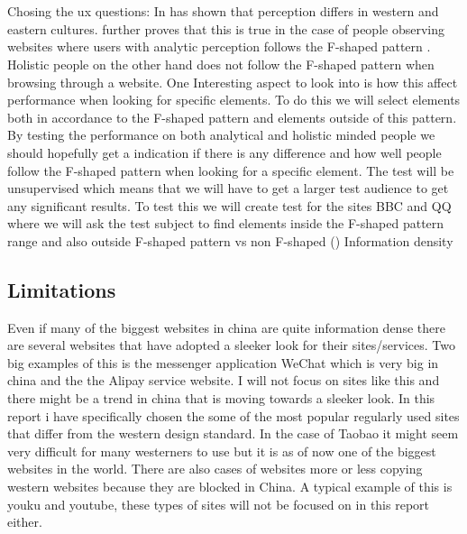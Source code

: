   \\\\
  Chosing the ux questions:
  In \cite{Holistic_vs_Analytic} has shown that perception differs in western and eastern cultures. \cite{cross_web} further proves that this is true in the case of people observing websites where users with analytic perception follows the F-shaped pattern \cite{pernice2014people}. Holistic people on the other hand does not follow the F-shaped pattern when browsing through a website. \cite{cross_web} One Interesting aspect to look into is how this affect performance when looking for specific elements. To do this we will select elements both in accordance to the F-shaped pattern and elements outside of this pattern. By testing the performance on both analytical and holistic minded people we should hopefully get a indication if there is any difference and how well people follow the F-shaped pattern when looking for a specific element. The test will be unsupervised which means that we will have to get a larger test audience to get any significant results. To test this we will create test for the sites BBC and QQ where we will ask the test subject to find elements inside the F-shaped pattern range and also outside
  F-shaped pattern vs non F-shaped (\cite{cross_web})
  Information density
   
 \subsection{Limitations}
 Even if many of the biggest websites in china are quite information dense there are several websites that have adopted a sleeker look for their sites/services. Two big examples of this is the messenger application WeChat which is very big in china and the the Alipay service website. I will not focus on sites like this and there might be a trend in china that is moving towards a sleeker look. In this report i have specifically chosen the some of the most popular regularly used sites that differ from the western design standard. In the case of Taobao it might seem very difficult for many westerners to use but it is as of now one of the biggest websites in the world. There are also cases of websites more or less copying western websites because they are blocked in China. A typical example of this is youku and youtube, these types of sites will not be focused on in this report either.